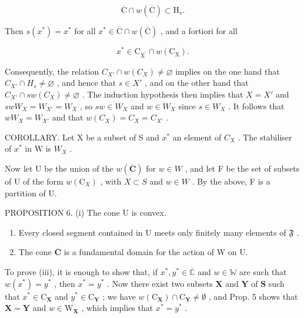 \[
\overline {{{\mathrm{C}}}} \cap w (\overline {{{\mathrm{C}}}}) \subset \mathrm{H} _ {s}.
\]

Then \(s(x^{*}) = x^{*}\) for all \(x^{*} \in \overline{\mathrm{C}} \cap w(\overline{\mathrm{C}})\) , and a fortiori for all

\[
x ^ {*} \in \mathrm{C} _ {\mathrm{X} ^ {\prime}} \cap w (\mathrm{C} _ {\mathrm{X}}).
\]

Consequently, the relation \(C_{X'} \cap w(C_X) \neq \varnothing\) implies on the one hand that \(C_{X'} \cap H_s \neq \varnothing\) , and hence that \(s \in X'\) , and on the other hand that \(C_{X'} \cap sw(C_X) \neq \varnothing\) . The induction hypothesis then implies that \(X = X'\) and \(swW_X = W_{X'} = W_X\) , so \(sw \in W_X\) and \(w \in W_X\) since \(s \in W_X\) . It follows that \(wW_X = W_{X'}\) and that \(w(C_X) = C_X = C_{X'}\) .

COROLLARY. Let X be a subset of S and \(x^{*}\) an element of \(C_{X}\) . The stabiliser of \(x^{*}\) in W is \(W_{X}\) .

Now let U be the union of the \(w(\overline{\mathbf{C}})\) for \(w \in W\) , and let F be the set of subsets of U of the form \(w(\mathrm{C}_{X})\) , with \(X \subset S\) and \(w \in W\) . By the above, F is a partition of U.

PROPOSITION 6. (i) The cone U is convex.

\begin{enumerate}
\def\labelenumi{(\roman{enumi})}
\setcounter{enumi}{1}
\item
  Every closed segment contained in U meets only finitely many elements of \(\mathfrak{F}\) .
\item
  The cone \(\overline{\mathbf{C}}\) is a fundamental domain for the action of W on U.
\end{enumerate}

To prove (iii), it is enough to show that, if \(x^{*}, y^{*} \in \overline{\mathbb{C}}\) and \(w \in \mathbb{W}\) are such that \(w(x^{*}) = y^{*}\) , then \(x^{*} = y^{*}\) . Now there exist two subsets \(\mathbf{X}\) and \(\mathbf{Y}\) of \(\mathbf{S}\) such that \(x^{*} \in \mathrm{C}_{\mathbf{X}}\) and \(y^{*} \in \mathrm{C}_{\mathbf{Y}}\) ; we have \(w(\mathrm{C}_{\mathbf{X}}) \cap \mathrm{C}_{\mathbf{Y}} \neq \emptyset\) , and Prop. 5 shows that \(\mathbf{X} = \mathbf{Y}\) and \(w \in \mathrm{W}_{\mathbf{X}}\) , which implies that \(x^{*} = y^{*}\) .

